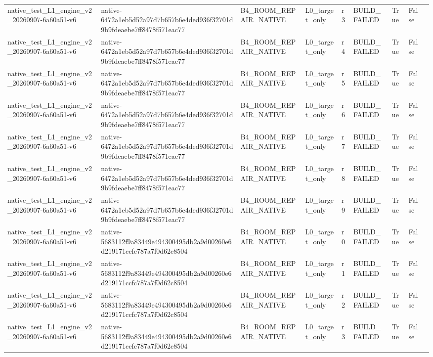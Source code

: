 \begin{tabular}{lllllllll}
native\_test\_L1\_engine\_v2\_20260907-6a60a51-v6 & native-6472a1eb5d52a97d7b657b6e4ded936f32701d9b9fdeaebe7ff8478f571eac77 & B4\_ROOM\_REPAIR\_NATIVE & L0\_target\_only & r3 & BUILD\_FAILED & True & False &  \\
native\_test\_L1\_engine\_v2\_20260907-6a60a51-v6 & native-6472a1eb5d52a97d7b657b6e4ded936f32701d9b9fdeaebe7ff8478f571eac77 & B4\_ROOM\_REPAIR\_NATIVE & L0\_target\_only & r4 & BUILD\_FAILED & True & False &  \\
native\_test\_L1\_engine\_v2\_20260907-6a60a51-v6 & native-6472a1eb5d52a97d7b657b6e4ded936f32701d9b9fdeaebe7ff8478f571eac77 & B4\_ROOM\_REPAIR\_NATIVE & L0\_target\_only & r5 & BUILD\_FAILED & True & False &  \\
native\_test\_L1\_engine\_v2\_20260907-6a60a51-v6 & native-6472a1eb5d52a97d7b657b6e4ded936f32701d9b9fdeaebe7ff8478f571eac77 & B4\_ROOM\_REPAIR\_NATIVE & L0\_target\_only & r6 & BUILD\_FAILED & True & False &  \\
native\_test\_L1\_engine\_v2\_20260907-6a60a51-v6 & native-6472a1eb5d52a97d7b657b6e4ded936f32701d9b9fdeaebe7ff8478f571eac77 & B4\_ROOM\_REPAIR\_NATIVE & L0\_target\_only & r7 & BUILD\_FAILED & True & False &  \\
native\_test\_L1\_engine\_v2\_20260907-6a60a51-v6 & native-6472a1eb5d52a97d7b657b6e4ded936f32701d9b9fdeaebe7ff8478f571eac77 & B4\_ROOM\_REPAIR\_NATIVE & L0\_target\_only & r8 & BUILD\_FAILED & True & False &  \\
native\_test\_L1\_engine\_v2\_20260907-6a60a51-v6 & native-6472a1eb5d52a97d7b657b6e4ded936f32701d9b9fdeaebe7ff8478f571eac77 & B4\_ROOM\_REPAIR\_NATIVE & L0\_target\_only & r9 & BUILD\_FAILED & True & False &  \\
native\_test\_L1\_engine\_v2\_20260907-6a60a51-v6 & native-5683112f9a83449e494300495db2a9d00260e6d219171ccfc787a7f0d62c8504 & B4\_ROOM\_REPAIR\_NATIVE & L0\_target\_only & r0 & BUILD\_FAILED & True & False &  \\
native\_test\_L1\_engine\_v2\_20260907-6a60a51-v6 & native-5683112f9a83449e494300495db2a9d00260e6d219171ccfc787a7f0d62c8504 & B4\_ROOM\_REPAIR\_NATIVE & L0\_target\_only & r1 & BUILD\_FAILED & True & False &  \\
native\_test\_L1\_engine\_v2\_20260907-6a60a51-v6 & native-5683112f9a83449e494300495db2a9d00260e6d219171ccfc787a7f0d62c8504 & B4\_ROOM\_REPAIR\_NATIVE & L0\_target\_only & r2 & BUILD\_FAILED & True & False &  \\
native\_test\_L1\_engine\_v2\_20260907-6a60a51-v6 & native-5683112f9a83449e494300495db2a9d00260e6d219171ccfc787a7f0d62c8504 & B4\_ROOM\_REPAIR\_NATIVE & L0\_target\_only & r3 & BUILD\_FAILED & True & False &  \\

\end{tabular}
